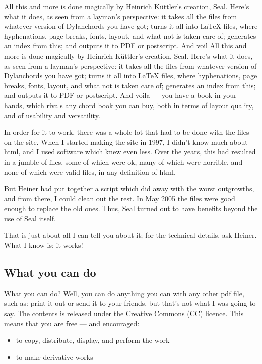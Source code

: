 \begin{articlelayout}
All this and more is done magically by Heinrich K\"uttler's creation,
Seal. Here's what it does, as seen from a layman's perspective: it
takes all the files from whatever version of Dylanchords you have got;
turns it all into LaTeX files, where hyphenations, page breaks, fonts,
layout, and what not is taken care of; generates an index from this;
and outputs it to PDF or postscript. And voil All this and more is
done magically by Heinrich K\"uttler's creation, Seal. Here's what it
does, as seen from a layman's perspective: it takes all the files from
whatever version of Dylanchords you have got; turns it all into LaTeX
files, where hyphenations, page breaks, fonts, layout, and what not is
taken care of; generates an index from this; and outputs it to PDF or
postscript. And voila --- you have a book in your hands, which rivals
any chord book you can buy, both in terms of layout quality, and of
usability and versatility.
 
In order for it to work, there was a whole lot that had to be done
with the files on the site. When I started making the site in 1997, I
didn't know much about html, and I used software which knew even
less. Over the years, this had resulted in a jumble of files, some of
which were ok, many of which were horrible, and none of which were
valid files, in any definition of html.
 
But Heiner had put together a script which did away with the worst
outgrowths, and from there, I could clean out the rest. In May 2005
the files were good enough to replace the old ones. Thus, Seal turned
out to have benefits beyond the use of Seal itself.
 
That is just about all I can tell you about it; for the technical
details, ask Heiner. What I know is: it works!

\subsection*{What you can do}
 
What you can do? Well, you can do anything you can with any other pdf
file, such as: print it out or send it to your friends, but that's not
what I was going to say. The contents is released under the Creative
Commons (CC) licence. This means that you are free --- and encouraged:

\begin{itemize}
  \item to copy, distribute, display, and perform the work
  \item to make derivative works
\end{itemize}


\end{articlelayout}
